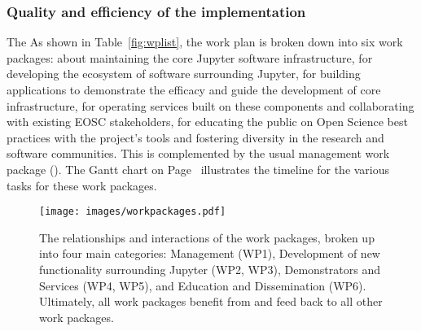 

\subsubsection{Quality and efficiency of the implementation}\label{sec:workplan-structure}

\ifgrantagreement
The
\else
As shown in Table~\ref{fig:wplist}, the
\fi
work plan is broken down into
six work packages:
 about maintaining the core Jupyter software infrastructure,
 for developing the ecosystem of software surrounding Jupyter,
 for building applications to demonstrate the efficacy and guide the development
of core infrastructure,
 for operating services built on these
components and collaborating with existing EOSC stakeholders,
 for educating the public on Open Science best practices with the project's tools
and fostering diversity in the research and software communities.
This is complemented by
the usual management  work package
(). The Gantt chart on
Page~\pageref{fig:gantt} illustrates the timeline for the various
tasks for these work packages.

\ifgrantagreement\else
\wpfigstyle{\footnotesize\def\tabcolsep{3.5pt}}
{\wpfig}
\fi

\begin{figure}[htb]
  \centering
  \texttt{[image: images/workpackages.pdf]}
  \caption{
    \label{fig:workpackages}
    The relationships and interactions of the work packages,
    broken up into four main categories: Management (WP1),
    Development of new functionality surrounding Jupyter (WP2, WP3),
    Demonstrators and Services (WP4, WP5),
    and Education and Dissemination (WP6).
    Ultimately, all work packages benefit from and feed back to
    all other work packages.
  }
\end{figure}

